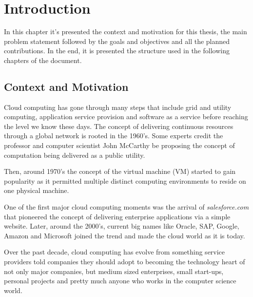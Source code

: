 \newcommand{\novathesis}{\emph{novathesis}}
\newcommand{\novathesisclass}{\texttt{novathesis.cls}}


\chapter{Introduction}
\label{cha:introduction}

In this chapter it's presented the context and motivation for this thesis, the main problem statement followed by the goals and objectives and all the planned contributions. In the end, it is presented the structure used in the following chapters of the document.

\section{Context and Motivation} %
\label{sec:context_and_motivation}

Cloud computing has gone through many steps that include grid and utility computing, application service provision and software as a service before reaching the level we know these days. The concept of delivering continuous resources through a global network is rooted in the 1960's. Some experts credit the professor and computer scientist John McCarthy \cite{john_mcCarthy:1} be proposing the concept of computation being delivered as a public utility.

Then, around 1970's the concept of the virtual machine (\gls{VM}) started to gain popularity as it permitted multiple distinct computing environments to reside on one physical machine.

One of the first major cloud computing moments was the arrival of \textit{salesforce.com} that pioneered the concept of delivering enterprise applications via a simple website. Later, around the 2000's, current big names like Oracle, SAP, Google, Amazon and Microsoft joined the trend and made the cloud world as it is today. \cite{cloud_history:1} \cite{cloud_history:2}

Over the past decade, cloud computing has evolve from something service providers told companies they should adopt to becoming the technology heart of not only major companies, but medium sized enterprises, small start-ups, personal projects and pretty much anyone who works in the computer science world. 

